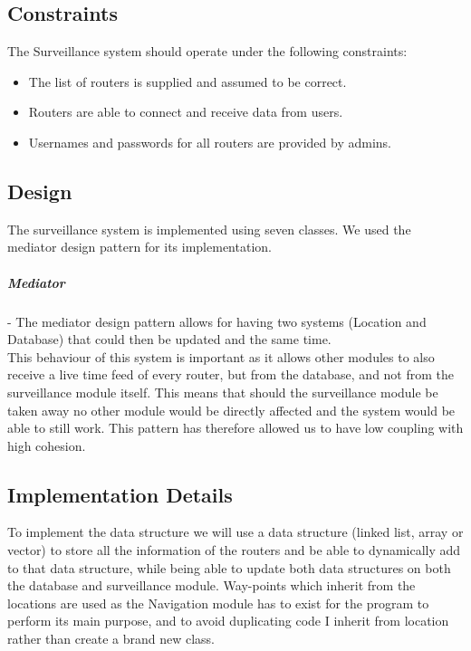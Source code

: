 \documentclass[english]{article}
\begin{document}
        \subsection{Constraints}
        The Surveillance system should operate under the following constraints:
            \begin{itemize}
                \item The list of routers is supplied and assumed to be correct.
                \item Routers are able to connect and receive data from users.
                \item Usernames and passwords for all routers are provided by admins.
            \end{itemize}
        
        \subsection{Design}    
            The surveillance system is implemented using seven classes. We used the mediator design pattern for its implementation.
    
            \subparagraph{Mediator} - The mediator design pattern allows for having two systems (Location and Database) that could then be updated and the same time. \\
            
            This behaviour of this system is important as it allows other modules to also receive a live time feed of every router, but from the database, and not from the surveillance module itself.
            This means that should the surveillance module be taken away no other module would be directly affected and the system would be able to still work. This pattern has therefore allowed us to have low coupling with high cohesion.
    
        \subsection{Implementation Details}    
            To implement the data structure we will use a data structure (linked list, array or vector) to store all the information of the routers and be able to dynamically add to that data structure, while being able to update both data structures on both the database and surveillance module. Way-points which inherit from the locations are  used as the Navigation module has to exist for the program to perform its main purpose, and to avoid duplicating code I inherit from location rather than create a brand new class.
\end{document}
